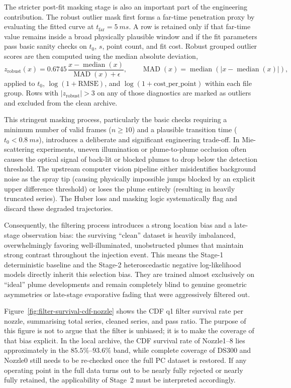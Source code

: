 \documentclass[english, 12pt, a4paper, elec, utf8, a-2b, online]{aaltothesis}
\begin{document}
The stricter post-fit masking stage is also an important part of the engineering contribution. The robust outlier mask first forms a far-time penetration proxy by evaluating the fitted curve at \(t_{\mathrm{far}}=\SI{5}{ms}\). A row is retained only if that far-time value remains inside a broad physically plausible window and if the fit parameters pass basic sanity checks on \(t_0\), \(s\), point count, and fit cost. Robust grouped outlier scores are then computed using the median absolute deviation,
\[
z_{\mathrm{robust}}(x)=0.6745\,\frac{x-\operatorname{median}(x)}{\operatorname{MAD}(x)+\epsilon},
\qquad
\operatorname{MAD}(x)=\operatorname{median}\!\left(\lvert x-\operatorname{median}(x)\rvert\right),
\]
applied to \(t_0\), \(\log(1+\mathrm{RMSE})\), and \(\log(1+\mathrm{cost\_per\_point})\) within each file group. Rows with \(|z_{\mathrm{robust}}|>3\) on any of those diagnostics are marked as outliers and excluded from the clean archive. 

This stringent masking process, particularly the basic checks requiring a minimum number of valid frames (\(n \ge 10\)) and a plausible transition time (\(t_0 < \SI{0.8}{ms}\)), introduces a deliberate and significant engineering trade-off. In Mie-scattering experiments, uneven illumination or plume-to-plume occlusion often causes the optical signal of back-lit or blocked plumes to drop below the detection threshold. The upstream computer vision pipeline either misidentifies background noise as the spray tip (causing physically impossible jumps blocked by an explicit upper difference threshold) or loses the plume entirely (resulting in heavily truncated series). The Huber loss and masking logic systematically flag and discard these degraded trajectories.

Consequently, the filtering process introduces a strong location bias and a late-stage observation bias: the surviving ``clean'' dataset is heavily imbalanced, overwhelmingly favoring well-illuminated, unobstructed plumes that maintain strong contrast throughout the injection event. This means the Stage-1 deterministic baseline and the Stage-2 heteroscedastic negative log-likelihood models directly inherit this selection bias. They are trained almost exclusively on ``ideal'' plume developments and remain completely blind to genuine geometric asymmetries or late-stage evaporative fading that were aggressively filtered out.

Figure~\ref{fig:filter-survival-cdf-nozzle} shows the CDF q1 filter survival rate per nozzle, summarising total series, cleaned series, and pass ratio. The purpose of this figure is not to argue that the filter is unbiased; it is to make the coverage of that bias explicit. In the local archive, the CDF survival rate of Nozzle1--8 lies approximately in the \(85.5\%\)--\(93.6\%\) band, while complete coverage of DS300 and Nozzle0 still needs to be re-checked once the full PC dataset is restored. If any operating point in the full data turns out to be nearly fully rejected or nearly fully retained, the applicability of Stage~2 must be interpreted accordingly.
\end{document}

